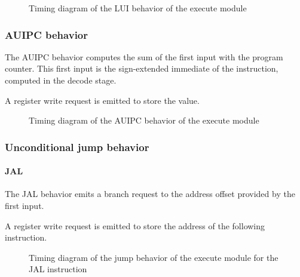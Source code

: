       \begin{figure}[H]
          \centering
          
          \caption{Timing diagram of the LUI behavior of the execute module}
          \label{fig:exm-behavior-lui}
        \end{figure}

    \subsubsection{AUIPC behavior}

      \begin{content}
          The AUIPC behavior computes the sum of the first input with the program counter. This first input is the sign-extended immediate of the instruction, computed in the decode stage.
          
          A register write request is emitted to store the value.
        \end{content}

      \begin{figure}[H]
          \centering
          
          \caption{Timing diagram of the AUIPC behavior of the execute module}
          \label{fig:exm-behavior-auipc}
        \end{figure}

    \subsubsection{Unconditional jump behavior}

      \paragraph{JAL}

      \begin{content}
          The JAL behavior emits a branch request to the address offset provided by the first input.
          
          A register write request is emitted to store the address of the following instruction.
        \end{content}

      \begin{figure}[H]
          \centering
          
          \caption{Timing diagram of the jump behavior of the execute module for the JAL instruction}
          \label{fig:exm-behavior-jump-jal}
        \end{figure}

